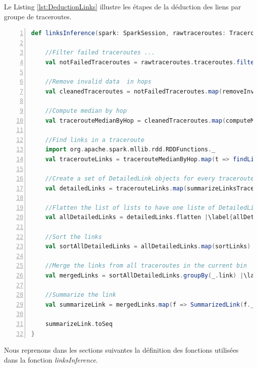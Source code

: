 Le Listing \ref{lst:DeductionLinks}
illustre les étapes de la déduction des liens par groupe de traceroutes.
\begin{lstlisting}[language=scala,firstnumber=1, caption={Deduction des liens par groupe de traceroutes},label={lst:DeductionLinks}, basicstyle = \footnotesize,escapechar=|,numbers=left,
stepnumber=1]
 def linksInference(spark: SparkSession, rawtraceroutes: TraceroutesPerPeriod): Seq[SummarizedLink] = {
	
	//Filter failed traceroutes ... 
	val notFailedTraceroutes = rawtraceroutes.traceroutes.filter(t => t.result(0).result != null) |\label{notFailedTraceroutes}|
	
	//Remove invalid data  in hops
	val cleanedTraceroutes = notFailedTraceroutes.map(removeInvalidSignals) |\label{cleanedTraceroutes}|
	
	//Compute median by hop
	val tracerouteMedianByHop = cleanedTraceroutes.map(computeMedianRTTByhop)|\label{tracerouteMedianByHopline}|
	
	//Find links in a traceroute
	import org.apache.spark.mllib.rdd.RDDFunctions._
	val tracerouteLinks = tracerouteMedianByHop.map(t => findLinksAndRttDiffByTraceroute(spark, t)) |\label{tracerouteLinksline}|
	
	//Create a set of DetailedLink objects for every traceroute
	val detailedLinks = tracerouteLinks.map(summarizeLinksTraceroute) |\label{liens-par-périodeline}|
	
	//Flatten the list of lists to have one liste of DetailedLink objects
	val allDetailedLinks = detailedLinks.flatten |\label{allDetailedLinksFlattenline}|
	
	//Sort the links
	val sortAllDetailedLinks = allDetailedLinks.map(sortLinks) |\label{sortAllDetailedLinksline}|
	
	//Merge the links from all traceroutes in the current bin
	val mergedLinks = sortAllDetailedLinks.groupBy(_.link) |\label{mergedLinksline}|
	
	//Summarize the link 
	val summarizeLink = mergedLinks.map(f => SummarizedLink(f._1, f._2.map(_.probe), f._2.map(_.rttDiff), generateDatesSample(f._2.size, rawtraceroutes.timeWindow)))  |\label{summarizeLinkline}|
	
	summarizeLink.toSeq    
}
\end{lstlisting}


Nous reprenons dans les sections suivantes la définition des fonctions utilisées dans la fonction \textit{linksInference}.

